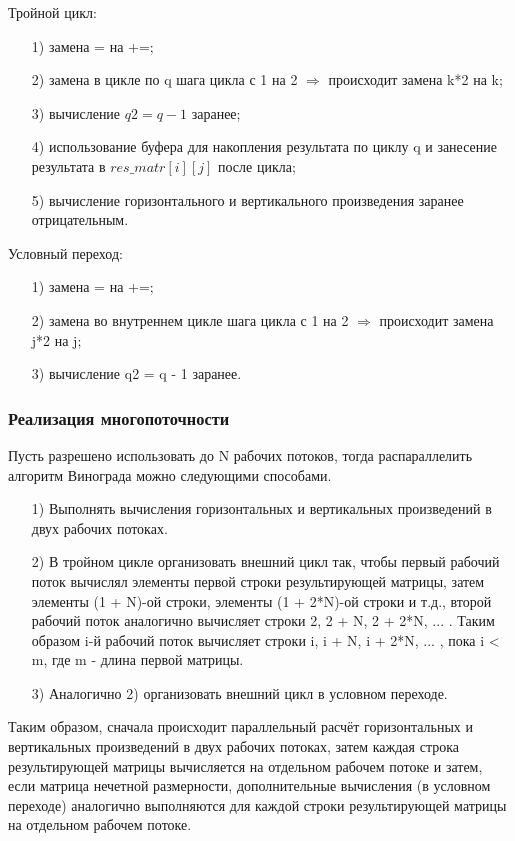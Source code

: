 \documentclass[a4paper,14pt]{article}
\begin{document}
	Тройной цикл:
	\begin{enumerate} 
	\item[1)] замена = на +=;
	\item[2)] замена в цикле по q шага цикла с 1 на 2 $\Rightarrow$ происходит замена k*2 на k;
	\item[3)] вычисление $q2 = q - 1$ заранее;
	\item[4)] использование буфера для накопления результата по циклу q и занесение результата в $res\_matr[i][j]$ после цикла;
	\item[5)] вычисление горизонтального и вертикального произведения заранее отрицательным.

	\end{enumerate}
	
	Условный переход:
	\begin{enumerate} 
	\item[1)] замена = на +=;
	\item[2)] замена во внутреннем цикле шага цикла с 1 на 2 $\Rightarrow$ происходит замена j*2 на j;
	\item[3)] вычисление q2 = q - 1 заранее.
	\end{enumerate}
    
    \subsubsection{Реализация многопоточности}
    Пусть разрешено использовать до N рабочих потоков, тогда распараллелить алгоритм Винограда можно следующими способами.
	  \begin{enumerate}
	  \item[1)] Выполнять вычисления горизонтальных и вертикальных произведений в двух рабочих потоках.
	  \item[2)] В тройном цикле организовать внешний цикл так, чтобы первый рабочий поток вычислял элементы первой строки результирующей матрицы, затем элементы (1 + N)-ой строки, элементы (1 + 2*N)-ой строки и т.д., второй рабочий поток аналогично вычисляет строки 2, 2 + N, 2 + 2*N, ... . Таким образом i-й рабочий поток вычисляет строки i, i + N, i + 2*N, ... , пока i < m, где m - длина первой матрицы.
	  \item[3)] Аналогично 2) организовать внешний цикл в условном переходе.
	  \end{enumerate}
	  
	  Таким образом, сначала происходит параллельный расчёт горизонтальных и вертикальных произведений в двух рабочих потоках, затем каждая строка результирующей матрицы вычисляется на отдельном рабочем потоке и затем, если матрица нечетной размерности, дополнительные вычисления (в условном переходе) аналогично выполняются для каждой строки результирующей матрицы на отдельном рабочем потоке.
	    
\end{document}
